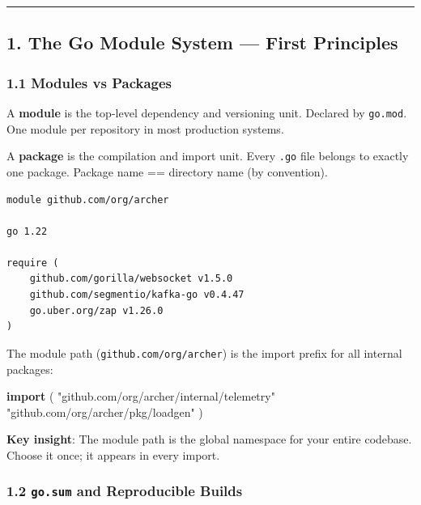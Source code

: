 \documentclass[
]{article}
\newenvironment{Shaded}{}{}
\newcommand{\KeywordTok}[1]{\textcolor[rgb]{0.00,0.44,0.13}{\textbf{#1}}}
\newcommand{\OperatorTok}[1]{\textcolor[rgb]{0.40,0.40,0.40}{#1}}
\newcommand{\StringTok}[1]{\textcolor[rgb]{0.25,0.44,0.63}{#1}}
\begin{document}
\begin{center}\rule{0.5\linewidth}{0.5pt}\end{center}

\hypertarget{the-go-module-system-first-principles}{%
\subsection{1. The Go Module System --- First
Principles}\label{the-go-module-system-first-principles}}

\hypertarget{modules-vs-packages}{%
\subsubsection{1.1 Modules vs Packages}\label{modules-vs-packages}}

A \textbf{module} is the top-level dependency and versioning unit.
Declared by \texttt{go.mod}. One module per repository in most
production systems.

A \textbf{package} is the compilation and import unit. Every
\texttt{.go} file belongs to exactly one package. Package name ==
directory name (by convention).

\begin{verbatim}
module github.com/org/archer

go 1.22

require (
    github.com/gorilla/websocket v1.5.0
    github.com/segmentio/kafka-go v0.4.47
    go.uber.org/zap v1.26.0
)
\end{verbatim}

The module path (\texttt{github.com/org/archer}) is the import prefix
for all internal packages:

\begin{Shaded}
\begin{Highlighting}[]
\KeywordTok{import} \OperatorTok{(}
    \StringTok{"github.com/org/archer/internal/telemetry"}
    \StringTok{"github.com/org/archer/pkg/loadgen"}
\OperatorTok{)}
\end{Highlighting}
\end{Shaded}

\textbf{Key insight}: The module path is the global namespace for your
entire codebase. Choose it once; it appears in every import.

\hypertarget{go.sum-and-reproducible-builds}{%
\subsubsection{\texorpdfstring{1.2 \texttt{go.sum} and Reproducible
Builds}{1.2 go.sum and Reproducible Builds}}\label{go.sum-and-reproducible-builds}}
\end{document}
